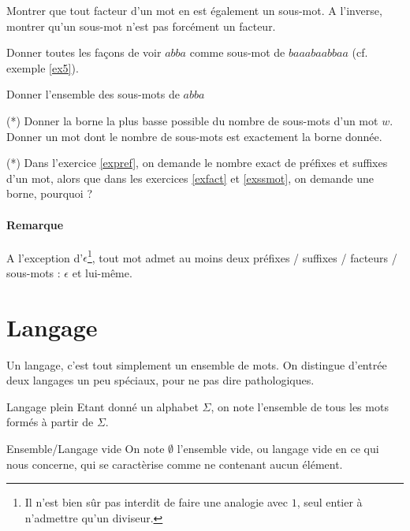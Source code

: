 \begin{exercice}
Montrer que tout facteur d'un mot en est également un sous-mot. A l'inverse, montrer qu'un sous-mot n'est pas forcément un facteur. 
\end{exercice}

\begin{exercice}
Donner toutes les façons de voir $abba$ comme sous-mot de $baaabaabbaa$ (cf. exemple \ref{ex5}).
\end{exercice}

\begin{exercice}
Donner l'ensemble des sous-mots de $abba$
\end{exercice}

\begin{exercice}\label{exssmot} (*)
Donner la borne la plus basse possible du nombre de sous-mots d'un mot $w$. Donner un mot dont le nombre de sous-mots est exactement la borne donnée.
\end{exercice}

\begin{exercice} (*) Dans l'exercice \ref{expref}, on demande le nombre exact de préfixes et suffixes d'un mot, alors que dans les exercices \ref{exfact} et \ref{exssmot}, on demande une borne, pourquoi ?

\end{exercice}

\paragraph{Remarque} A l'exception d'$\epsilon$\footnote{Il n'est bien sûr pas interdit de faire une analogie avec $1$, seul entier à n'admettre qu'un diviseur.}, tout mot admet au moins deux préfixes / suffixes / facteurs / sous-mots : $\epsilon$ et lui-même. 


\section{Langage}


Un langage, c'est tout simplement un ensemble de mots. On distingue d'entrée deux langages un peu spéciaux, pour ne pas dire pathologiques.

\begin{definition}{Langage plein}{}
Etant donné un alphabet $\Sigma$, on note \mathbf{$\Sigma^*$} l'ensemble de tous les mots formés à partir de $\Sigma$.
\end{definition}


\begin{definition}{Ensemble/Langage vide}{}
On note $\emptyset$ l'ensemble vide, ou langage vide en ce qui nous concerne, qui se caractèrise comme ne contenant aucun élément.
\end{definition}


